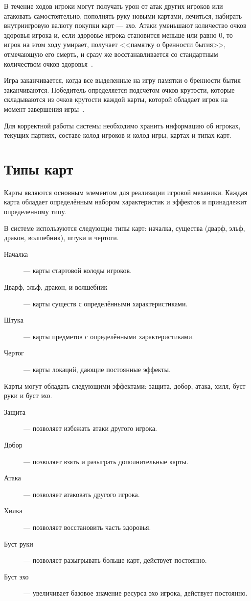 В течение ходов игроки могут получать урон от атак других игроков или атаковать самостоятельно, пополнять руку новыми картами, лечиться, набирать внутриигровую валюту покупки карт --- эхо. Атаки уменьшают количество очков здоровья игрока и, если здоровье игрока становится меньше или равно 0, то игрок на этом ходу умирает, получает <<памятку о бренности бытия>>, отмечающую его смерть, и сразу же восстанавливается со стандартным количеством очков здоровья~\cite{rules}.

Игра заканчивается, когда все выделенные на игру памятки о бренности бытия заканчиваются. Победитель определяется подсчётом очков крутости, которые складываются из очков крутости каждой карты, которой обладает игрок на момент завершения игры~\cite{rules}.

Для корректной работы системы необходимо хранить информацию об игроках, текущих партиях, составе колод игроков и колод игры, картах и типах карт.


\section{Типы карт}
Карты являются основным элементом для реализации игровой механики. Каждая карта обладает определённым набором характеристик и эффектов и принадлежит определенному типу.

В системе используются следующие типы карт: началка, существа (дварф, эльф, дракон, волшебник), штуки и чертоги.
\begin{description}
    \item[Началка] --- карты стартовой колоды игроков.

    \item[Дварф, эльф, дракон, и волшебник] --- карты существ с
    определёнными характеристиками.

    \item[Штука] --- карты предметов с определёнными характеристиками.

    \item[Чертог] --- карты локаций, дающие постоянные эффекты.
\end{description}

Карты могут обладать следующими эффектами: защита, добор, атака, хилл, буст руки и буст эхо.

\begin{description}
    \item[Защита] --- позволяет избежать атаки другого игрока.

    \item[Добор] --- позволяет взять и разыграть дополнительные карты.

    \item[Атака] --- позволяет атаковать другого игрока.

    \item[Хилка] --- позволяет восстановить часть здоровья.

    \item[Буст руки] --- позволяет разыгрывать больше карт, действует постоянно.

    \item[Буст эхо] --- увеличивает базовое значение ресурса эхо игрока, действует постоянно.
\end{description}

